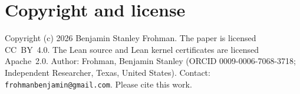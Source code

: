 \documentclass[11pt]{article}
\theoremstyle{plain}
\theoremstyle{definition}
\theoremstyle{remark}
\begin{document}
\section*{Copyright and license}

Copyright (c) 2026 Benjamin Stanley Frohman. The paper is licensed CC~BY~4.0. The Lean source and Lean kernel certificates are licensed Apache~2.0. Author: Frohman, Benjamin Stanley (ORCID 0009-0006-7068-3718; Independent Researcher, Texas, United States). Contact: \texttt{frohmanbenjamin@gmail.com}. Please cite this work.
\end{document}
